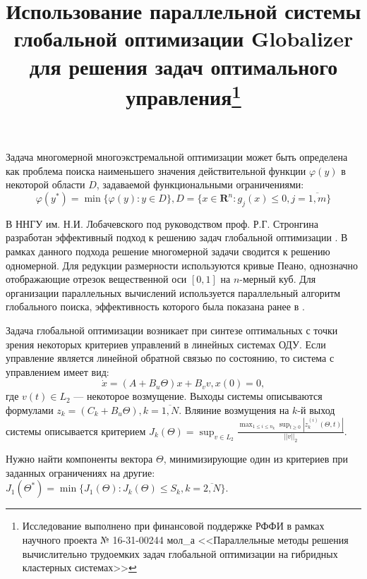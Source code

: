 \documentclass[11pt, oneside, a4paper]{article}
\begin{document}

\title{Использование параллельной системы глобальной оптимизации Globalizer для
решения задач оптимального управления\footnote{Исследование выполнено при финансовой
поддержке РФФИ в рамках научного проекта № 16-31-00244 мол\_а <<Параллельные методы
решения вычислительно трудоемких задач глобальной оптимизации на гибридных кластерных системах>>}}


Задача многомерной многоэкстремальной оптимизации может быть определена как проблема
поиска наименьшего значения действительной функции \(\varphi(y)\) в некоторой области \(D\),
задаваемой функциональными ограничениями:
\begin{displaymath}
  \label{task}
    \varphi(y^*)=\min\{\varphi(y):y\in D\}, D=\{x\in \mathbf{R}^n: g_j(x) \le 0, j=\overline{1,m}\}
\end{displaymath}

В ННГУ им. Н.И. Лобачевского под руководством проф. Р.Г. Стронгина разработан
эффективный подход к решению задач глобальной оптимизации \cite{strGergrParOptBook}.
В рамках данного подхода решение многомерной задачи сводится к решению одномерной.
Для редукции размерности используются кривые Пеано, однозначно отображающие отрезок
вещественной оси \([0,1]\) на \(n\)-мерный куб. Для организации параллельных вычислений
используется параллельный алгоритм глобального поиска, эффективность которого была
показана ранее в \cite{parallelMethod}.

Задача глобальной оптимизации возникает при синтезе оптимальных с точки зрения некоторых
критериев управлений в линейных системах ОДУ. Если управление является линейной обратной
связью по состоянию, то система с управлением имеет вид:
\begin{displaymath}
    \dot x = (A+B_u\Theta)x + B_v v, x(0)=0,
\end{displaymath}
где  \(v(t)\in L_2\) --- некоторое возмущение.
Выходы системы описываются формулами \(z_k=(C_k+B_u\Theta),k=\overline{1,N}\).
Вляиние возмущения на \(k\)-й выход системы описывается критерием
\(  J_k(\Theta)=\sup_{v\in L_2} \frac{\max_{1\le i \le n_k} \sup_{t\ge 0}|z_k^{(i)}(\Theta,t)|}{||v||_2}\).

Нужно найти компоненты вектора \(\Theta\), минимизирующие один из критериев при
заданных ограничениях на другие: \(J_1(\Theta^*)=\min\{J_1(\Theta):J_k(\Theta)\le S_k,k=\overline{2,N}\}\).
\end{document}
